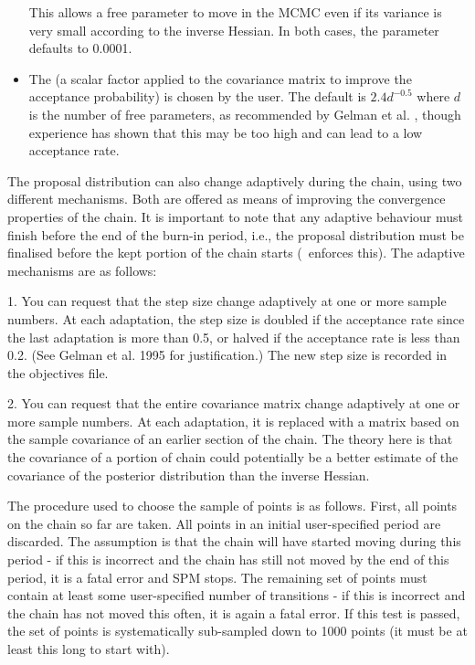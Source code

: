 \begin{itemize}
This allows a free parameter to move in the MCMC even if its variance is very small according to the inverse Hessian. In both cases, the  parameter defaults to 0.0001.

\item The  (a scalar factor applied to the covariance matrix to improve the acceptance probability) is chosen by the user. The default is $2.4d^{-0.5}$ where $d$ is the number of free parameters, as recommended by Gelman et al. \citep{823}, though experience has shown that this may be too high and can lead to a low acceptance rate. 
\end{itemize}

The proposal distribution can also change adaptively during the chain, using two different mechanisms. Both are offered as means of improving the convergence properties of the chain. It is important to note that any adaptive behaviour must finish before the end of the burn-in period, i.e., the proposal distribution must be finalised before the kept portion of the chain starts (\SPM\ enforces this). The adaptive mechanisms are as follows: 

1.	You can request that the step size change adaptively at one or more sample numbers. At each adaptation, the step size is doubled if the acceptance rate since the last adaptation is more than 0.5, or halved if the acceptance rate is less than 0.2. (See Gelman et al. 1995 for justification.) The new step size is recorded in the objectives file. 

2.	You can request that the entire covariance matrix change adaptively at one or more sample numbers. At each adaptation, it is replaced with a matrix based on the sample covariance of an earlier section of the chain. The theory here is that the covariance of a portion of chain could potentially be a better estimate of the covariance of the posterior distribution than the inverse Hessian.

	The procedure used to choose the sample of points is as follows. First, all points on the chain so far are taken. All points in an initial user-specified period are discarded. The assumption is that the chain will have started moving during this period - if this is incorrect and the chain has still not moved by the end of this period, it is a fatal error and SPM stops. The remaining set of points must contain at least some user-specified number of transitions - if this is incorrect and the chain has not moved this often, it is again a fatal error. If this test is passed, the set of points is systematically sub-sampled down to 1000 points (it must be at least this long to start with).

